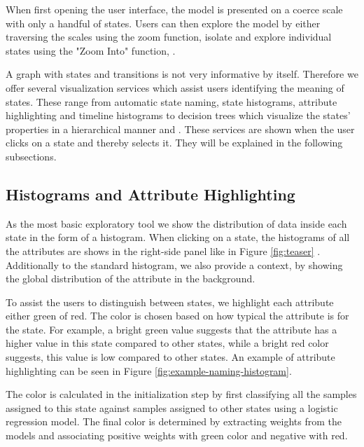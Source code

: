 When first opening the user interface, the model is presented on a coerce scale with only a handful
of states. Users can then explore the model by either traversing the scales using the zoom 
function, isolate and explore individual states using the "Zoom Into" function, .

A graph with states and transitions is not very informative by itself. Therefore we offer several 
visualization services which assist users identifying the meaning of states. These range from automatic
state naming, state histograms, attribute highlighting and timeline histograms to decision trees
which visualize the states' properties in a hierarchical manner and .
These services are shown when the user clicks on a state and thereby selects it. They will be 
explained in the following subsections.

\subsection{Histograms and Attribute Highlighting}

As the most basic exploratory tool we show the distribution of data inside each state in the form of a histogram.
When clicking on a state, the histograms of all the attributes are shows in the right-side panel like in
Figure \ref{fig:teaser} . Additionally to the standard histogram, we also 
provide a context, by showing the global distribution of the attribute in the background.

To assist the users to distinguish between states, we highlight each attribute either green of red.
The color is chosen based on how typical the attribute is for the state. For example, a bright green
value suggests that the attribute has a higher value in this state compared to other states, while
a bright red color suggests, this value is low compared to other states. An example of attribute 
highlighting can be seen in Figure \ref{fig:example-naming-histogram}.

The color is calculated in the initialization step by first classifying all the samples assigned to this state 
against samples assigned to other states using a logistic regression model. 
The final color is determined by extracting weights from the models and associating positive weights
with green color and negative with red.

